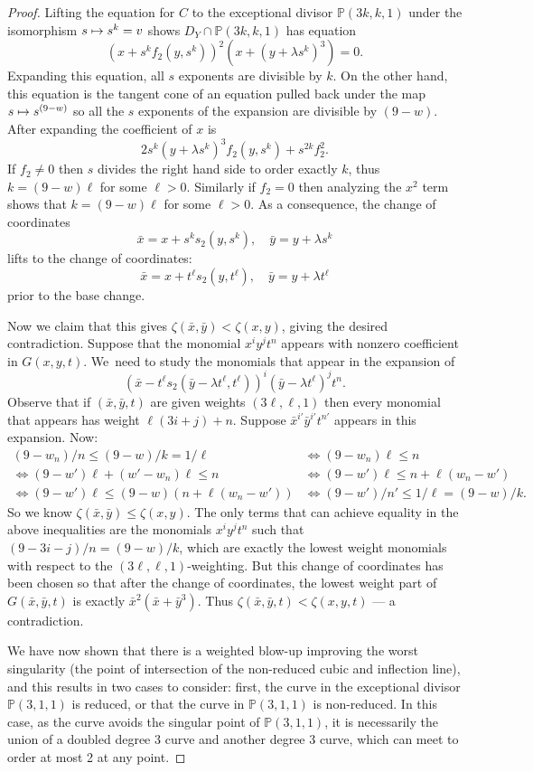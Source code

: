 \documentclass[JEP,XML,SOM,Unicode,NoFloatCountersInSection,published]{cedram}
\newcommand\mto{\mathchoice{\longmapsto}{\mapsto}{\mapsto}{\mapsto}}
\theoremstyle{plain}
\theoremstyle{definition}
\newcommand\PP{{\mathbb{P}}}
\newcommand\xbar{{\bar{x}}}
\newcommand\ybar{{\bar{y}}}
\begin{document}
\begin{proof}
Lifting the equation for $C$ to the exceptional divisor $\PP(3k,k,1)$ under the isomorphism $s \mto s^k = v$ shows $D_Y \cap \PP(3k,k,1)$ has equation
\[
(x+s^kf_2(y,s^k))^2(x+(y+\lambda s^k)^3) = 0.
\]
Expanding this equation, all $s$ exponents are divisible by $k$. On the other hand, this equation is the tangent cone of an equation pulled back under the map $s\mto s^{(9-w)}$ so all the $s$ exponents of the expansion are divisible by $(9-w)$. After expanding the coefficient of $x$ is
\[
2s^k(y+\lambda s^k)^3f_2(y,s^k) + s^{2k}f_2^2.
\]
If $f_2\ne 0$ then $s$ divides the right hand side to order exactly $k$, thus $k=(9-w)\ell$ for some $\ell>0$. Similarly if $f_2=0$ then analyzing the $x^2$ term shows that $k=(9-w)\ell$ for some $\ell>0$. As a consequence, the change of coordinates
\[
\xbar = x+s^ks_2(y,s^k),\quad \ybar = y+\lambda s^k
\]
lifts to the change of coordinates:
\[
\xbar = x+t^\ell s_2(y,t^\ell), \quad \ybar = y+\lambda t^\ell
\]
prior to the base change.

Now we claim that this gives $\zeta(\xbar,\ybar)< \zeta(x,y)$, giving the desired contradiction. Suppose that the monomial $x^iy^jt^n$ appears with nonzero coefficient in $G(x,y,t)$. We~need to study the monomials that appear in the expansion of
\[
(\xbar-t^\ell s_2(\ybar-\lambda t^\ell,t^\ell))^i(\ybar-\lambda t^\ell)^jt^n.
\]
Observe that if $(\xbar,\ybar,t)$ are given weights $(3\ell,\ell,1)$ then every monomial that appears has weight $\ell(3i+j)+n$. Suppose $\xbar^{i'}\ybar^{i'}t^{n'}$ appears in this expansion. Now:
\begin{align*}
(9-w_n)/n\le(9-w)/k=1/\ell &\iff (9-w_n)\ell \le n\\
\iff (9-w')\ell+(w'-w_n)\ell \le n &\iff (9-w')\ell\le n+\ell(w_n-w')\\
\iff (9-w')\ell \le (9-w)(n+\ell(w_n-w'))&\iff (9-w')/n'\le 1/\ell=(9-w)/k.
\end{align*}
So we know $\zeta(\xbar,\ybar)\le \zeta(x,y)$. The only terms that can achieve equality in the above inequalities are the monomials $x^iy^jt^n$ such that $(9-3i-j)/n = (9-w)/k$, which are exactly the lowest weight monomials with respect to the $(3\ell,\ell,1)$-weighting. But this change of coordinates has been chosen so that after the change of coordinates, the lowest weight part of $G(\xbar,\ybar,t)$ is exactly $\xbar^2(\xbar+\ybar^3)$. Thus $\zeta(\xbar,\ybar,t)<\zeta(x,y,t)$ --- a contradiction.

We have now shown that there is a weighted blow-up improving the worst singularity (the point of intersection of the non-reduced cubic and inflection line), and this results in two cases to consider: first, the curve in the exceptional divisor $\PP(3,1,1)$ is reduced, or that the curve in $\PP(3,1,1)$ is non-reduced. In this case, as the curve avoids the singular point of $\PP(3,1,1)$, it is necessarily the union of a doubled degree 3 curve and another degree 3 curve, which can meet to order at most 2 at any point.
\end{proof}
\end{document}
